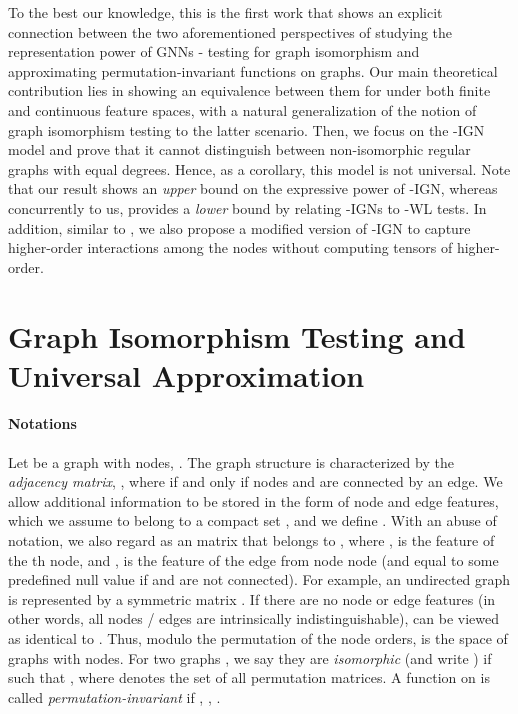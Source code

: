 \documentclass{article}
\begin{document}
To the best our knowledge, this is the first work that shows an explicit connection between the two aforementioned perspectives of studying the representation power of GNNs - testing for graph isomorphism and approximating permutation-invariant functions on graphs. Our main theoretical contribution lies in showing an equivalence between them for under both finite and continuous feature spaces, with a natural generalization of the notion of graph isomorphism testing to the latter scenario. Then, we focus on the -IGN model and prove that it cannot distinguish between non-isomorphic regular graphs with equal degrees. Hence, as a corollary, this model is not universal. Note that our result shows an \emph{upper} bound on the expressive power of -IGN, whereas concurrently to us, \cite{maron2019provably} provides a \emph{lower} bound by relating -IGNs to -WL tests. In addition, similar to \cite{maron2019provably}, we also propose a modified version of -IGN to capture higher-order interactions among the nodes without computing tensors of higher-order.



\section{Graph Isomorphism Testing and Universal Approximation}
\label{sec:giso_ua}
\paragraph{Notations} Let  be a graph with  nodes, . The graph structure is characterized by the \emph{adjacency matrix}, , where  if and only if nodes  and  are connected by an edge. We allow additional information to be stored in the form of node and edge features, which we assume to belong to a compact set , and we define . With an abuse of notation, we also regard  as an  matrix that belongs to , where ,  is the feature of the th node, and ,  is the feature of the edge from node  node  (and equal to some predefined null value if  and  are not connected). For example, an undirected graph is represented by a symmetric matrix . If there are no node or edge features (in other words, all nodes / edges are intrinsically indistinguishable),  can be viewed as identical to . Thus, modulo the permutation of the node orders,  is the space of graphs with  nodes. For two graphs , we say they are \emph{isomorphic} (and write ) if  such that , where  denotes the set of all  permutation matrices. A function  on  is called \textit{permutation-invariant} if , , . 
\end{document}
